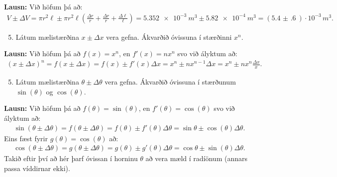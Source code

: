 \textbf{Lausn:} Við höfum þá að:
\begin{align*}
    V \pm \Delta V = \pi r^2 \ell \pm  \pi r^2 \ell \left( \frac{\Delta r}{r} + \frac{\Delta r}{r} + \frac{\Delta \ell }{\ell} \right) = \SI{5.352e-3}{m^3} \pm \SI{5.82e-4}{m^3} = (\SI{5.4(6)}{})\cdot 10^{-3} \, \si{m^3}.
\end{align*}


\begin{enumerate}[label = \textbf{Sýnidæmi \thechapter.\arabic*.}]

\setcounter{enumi}{4}

\item Látum mælistærðina $x \pm \Delta x$ vera gefna. Ákvarðið óvissuna í stærðinni $x^n$.

\end{enumerate}

\textbf{Lausn:} Við höfum þá að $f(x) = x^n$, en $f'(x) = n x^n$ svo við ályktum að:
\begin{align*}
    (x \pm \Delta x)^n = f(x \pm \Delta x) = f(x) \pm f'(x) \Delta x =  x^n \pm n x^{n-1} \Delta x =x^n \pm n x^n \frac{\Delta x}{x}.
\end{align*}

\begin{enumerate}[label = \textbf{Sýnidæmi \thechapter.\arabic*.}]

\setcounter{enumi}{4}

\item Látum mælistærðina $\theta \pm \Delta \theta$ vera gefna. Ákvarðið óvissuna í stærðunum $\sin(\theta)$ og $\cos(\theta)$.

\end{enumerate}

\textbf{Lausn:} Við höfum þá að $f(\theta) = \sin(\theta)$, en $f'(\theta) = \cos(\theta)$ svo við ályktum að:
\begin{align*}
    \sin(\theta \pm \Delta \theta) = f(\theta \pm \Delta \theta) = f(\theta) \pm f'(\theta) \Delta \theta =  \sin\theta \pm \cos(\theta)\Delta \theta.
\end{align*}
Eins fæst fyrir $g(\theta) =\cos(\theta)$ að:
\begin{align*}
    \cos(\theta \pm \Delta \theta) = g(\theta \pm \Delta \theta) = g(\theta) \pm g'(\theta) \Delta \theta =  \cos\theta \pm \sin(\theta)\Delta \theta.
\end{align*}
Takið eftir því að hér þarf óvissan í horninu $\theta$ að vera mæld í radíönum (annars passa víddirnar ekki).
\newpage

